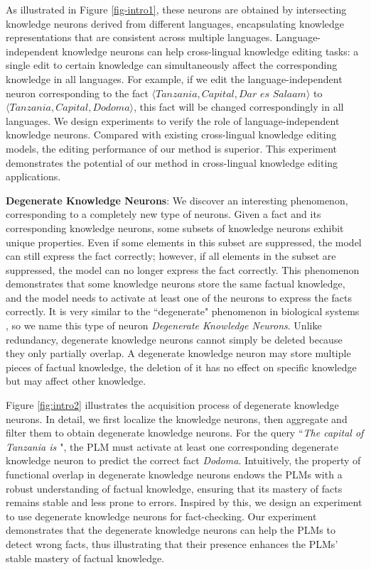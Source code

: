 \documentclass[]{article}
\begin{document}
As illustrated in Figure \ref{fig-intro1}, these neurons are obtained by intersecting knowledge neurons derived from different languages, encapsulating knowledge representations that are consistent across multiple languages. Language-independent knowledge neurons can help cross-lingual knowledge editing tasks: a single edit to certain knowledge can simultaneously affect the corresponding knowledge in all languages. For example, if we edit the language-independent neuron corresponding to the fact $\langle  \textit{Tanzania}, \textit{Capital}, \textit{Dar es Salaam} \rangle$ to $\langle \textit{Tanzania}, \textit{Capital}, \textit{Dodoma} \rangle$, this fact will be changed correspondingly in all languages. 
We design experiments to verify the role of language-independent knowledge neurons. Compared with existing cross-lingual knowledge editing models, the editing performance of our method is superior. This experiment demonstrates the potential of our method in cross-lingual knowledge editing applications.

\textbf{Degenerate Knowledge Neurons}: We discover an interesting phenomenon, corresponding to a completely new type of neurons. Given a fact and its corresponding knowledge neurons, some subsets of knowledge neurons exhibit unique properties. Even if some elements in this subset are suppressed, the model can still express the fact correctly; however, if all elements in the subset are suppressed, the model can no longer express the fact correctly. This phenomenon demonstrates that some knowledge neurons store the same factual knowledge, and the model needs to activate at least one of the neurons to express the facts correctly. It is very similar to the ``degenerate" phenomenon in biological systems \cite{degenerate_biological,mason2015degeneracy}, so we name this type of neuron \textit{Degenerate Knowledge Neurons}. 
Unlike redundancy, degenerate knowledge neurons cannot simply be deleted because they only partially overlap. A degenerate knowledge neuron may store multiple pieces of factual knowledge, the deletion of it has no effect on specific knowledge but may affect other knowledge.

Figure \ref{fig:intro2} illustrates the acquisition process of degenerate knowledge neurons. In detail, we first localize the knowledge neurons, then aggregate and filter them to obtain degenerate knowledge neurons. For the query ``\textit{The capital of Tanzania is \underline{\hspace{0.4cm}}}", the PLM must activate at least one corresponding degenerate knowledge neuron to predict the correct fact \textit{Dodoma}.
Intuitively, the property of functional overlap in degenerate knowledge neurons endows the PLMs with a robust understanding of factual knowledge, ensuring that its mastery of facts remains stable and less prone to errors. 
Inspired by this, we design an experiment to use degenerate knowledge neurons for fact-checking. Our experiment demonstrates that the degenerate knowledge neurons can help the PLMs to detect wrong facts, thus illustrating that their presence enhances the PLMs' stable mastery of factual knowledge.
\end{document}
